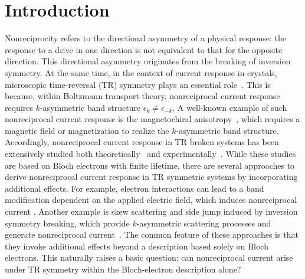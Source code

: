\documentclass[twocolumn,superscriptaddress]{revtex4-1}
\begin{document}
\section{Introduction}
Nonreciprocity refers to the directional asymmetry of a physical response: the response to a drive in one direction is not equivalent to that for the opposite direction. 
This directional asymmetry originates from the breaking of inversion symmetry. 
At the same time, in the context of current response in crystals, microscopic time-reversal (TR) symmetry plays an essential role~\cite{Tokura2018,Nagaosa2024}.
This is because, within Boltzmann transport theory, nonreciprocal current response requires $k$-asymmetric band structure $\epsilon_{k}\neq \epsilon_{-k}$.
A well-known example of such nonreciprocal current response is the magnetochiral anisotropy~\cite{Rikken2001}, which requires a magnetic field or magnetization to realize the $k$-asymmetric band structure.
Accordingly, nonreciprocal current response in TR broken systems has been extensively studied both theoretically~\cite{Morimoto2016,Wakatsuki2018,Hoshino2018,Watanabe2020,Watanabe2021,Das2023,Kaplan2024} and experimentally~\cite{Ideue2017,Yokouchi2017,Wakatsuki2017,Yasuda2019,Itahashi2020,Zhang2020,Zhao2020,Nakamura2025,Li2021,Wang2022,Wakamura2024}.
While these studies are based on Bloch electrons with finite lifetime, there are several approaches to derive nonreciprocal current response in TR symmetric systems by incorporating additional effects.
For example, electron interactions can lead to a band modification dependent on the applied electric field, which induces nonreciprocal current \cite{Morimoto2018}.
Another example is skew scattering and side jump induced by inversion symmetry breaking, which provide $k$-asymmetric scattering processes and generate nonreciprocal current~\cite{Isobe2020,Varshney2026}.
The common feature of these approaches is that they invoke additional effects beyond a description based solely on Bloch electrons.
This naturally raises a basic question: can nonreciprocal current arise under TR symmetry within the Bloch-electron description alone?
\end{document}
